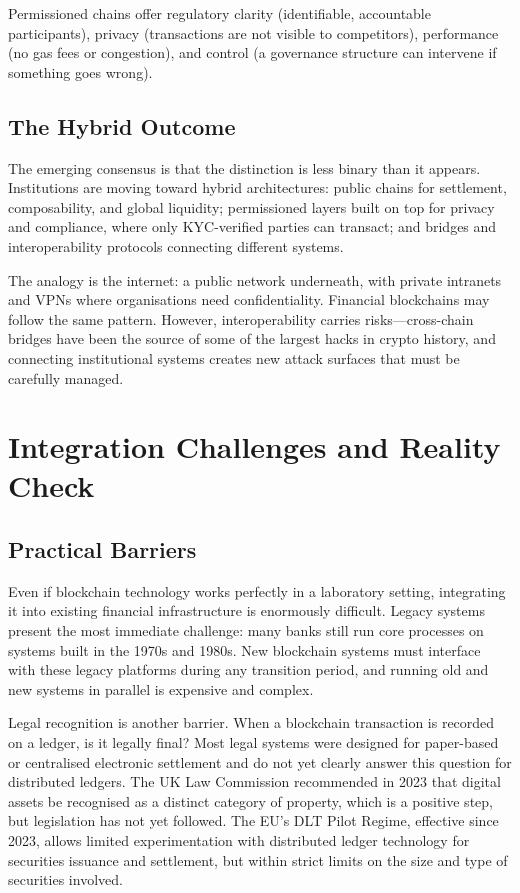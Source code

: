 \documentclass[11pt,a4paper]{article}
\begin{document}
Permissioned chains offer regulatory clarity (identifiable, accountable participants), privacy (transactions are not visible to competitors), performance (no gas fees or congestion), and control (a governance structure can intervene if something goes wrong).

\subsection{The Hybrid Outcome}

The emerging consensus is that the distinction is less binary than it appears. Institutions are moving toward hybrid architectures: public chains for settlement, composability, and global liquidity; permissioned layers built on top for privacy and compliance, where only KYC-verified parties can transact; and bridges and interoperability protocols connecting different systems.

The analogy is the internet: a public network underneath, with private intranets and VPNs where organisations need confidentiality. Financial blockchains may follow the same pattern. However, interoperability carries risks---cross-chain bridges have been the source of some of the largest hacks in crypto history, and connecting institutional systems creates new attack surfaces that must be carefully managed.

\section{Integration Challenges and Reality Check}

\subsection{Practical Barriers}

Even if blockchain technology works perfectly in a laboratory setting, integrating it into existing financial infrastructure is enormously difficult. Legacy systems present the most immediate challenge: many banks still run core processes on systems built in the 1970s and 1980s. New blockchain systems must interface with these legacy platforms during any transition period, and running old and new systems in parallel is expensive and complex.

Legal recognition is another barrier. When a blockchain transaction is recorded on a ledger, is it legally final? Most legal systems were designed for paper-based or centralised electronic settlement and do not yet clearly answer this question for distributed ledgers. The UK Law Commission recommended in 2023 that digital assets be recognised as a distinct category of property, which is a positive step, but legislation has not yet followed. The EU's DLT Pilot Regime, effective since 2023, allows limited experimentation with distributed ledger technology for securities issuance and settlement, but within strict limits on the size and type of securities involved.
\end{document}
